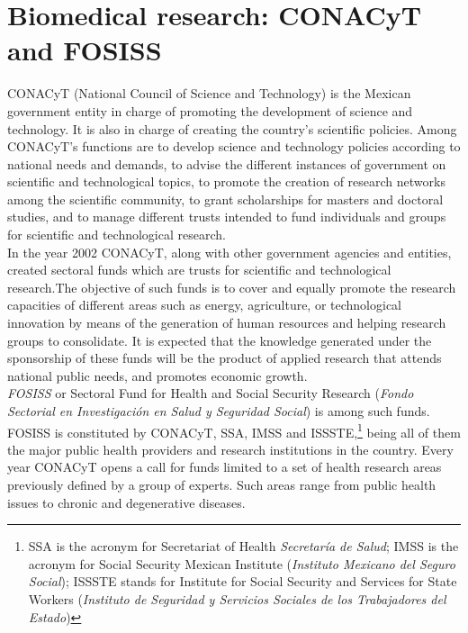 \documentclass[11pt]{article}
\begin{document}
\section{Biomedical research: CONACyT and FOSISS}
\label{sec:1}

CONACyT (National Council of Science and Technology) is the Mexican government
entity in charge of promoting the development of science and 
technology. It is also in charge of creating the country's scientific
policies.  Among CONACyT's functions are to develop science and technology
policies according to national needs and demands, to advise the different
instances of government on scientific and technological topics, to promote the
creation of research networks among the scientific community, to grant
scholarships for masters and doctoral studies, and to manage different trusts 
intended to fund individuals and groups for scientific and
technological research.\\

In the year 2002 CONACyT, along with other government agencies and
entities, created sectoral funds which are trusts for scientific and
technological research.The objective of such funds is to cover and equally
promote the research capacities of different areas such as energy, agriculture,
or technological innovation by means of the generation of human resources
and helping research groups to consolidate. It is expected that the
knowledge generated under the sponsorship of these funds
will be the product of applied research that attends national public
needs, and promotes economic growth.\\

\emph{FOSISS} or Sectoral Fund for Health and Social Security Research
(\emph{Fondo Sectorial en Investigaci\'on en Salud y Seguridad Social}) is among
such funds. FOSISS is constituted by CONACyT, SSA, IMSS and ISSSTE,\footnote{SSA
  is the acronym for Secretariat of Health \emph{Secretar\'ia de Salud}; IMSS is
  the acronym for Social Security Mexican Institute (\emph{Instituto Mexicano
    del Seguro Social}); ISSSTE stands for Institute for Social Security and
  Services for State Workers (\emph{Instituto de Seguridad y Servicios Sociales
    de los Trabajadores del Estado})} being all of them the major public health
providers and research institutions in the country. Every year CONACyT opens a
call for funds limited to a set of health research areas previously defined by a
group of experts. Such areas range from public health issues to chronic and
degenerative diseases.\\  
\end{document}
